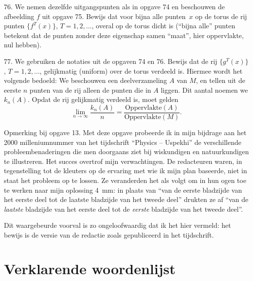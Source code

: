 \begin{problem}{76.}
	We nemen dezelfde uitgangspunten als in opgave 74 en beschou\-wen de afbeelding $f$ uit opgave 75. Bewijs dat voor bijna alle punten~$x$ op de torus de rij punten $\{f^T (x)\}$, $T=1,2,\dotsc$, overal op de torus dicht is (\enquote{bijna alle} punten betekent dat de punten zonder deze eigen\-schap samen \enquote{maat}, hier oppervlakte, nul hebben).
\end{problem}

\begin{problem}{77.}
	We gebruiken de notaties uit de opgaven 74 en 76. Bewijs dat de rij $\{g^T (x)\}$, $T=1,2,\dotsc$, gelijkmatig (uniform) over de torus verdeeld is. Hiermee wordt het volgende bedoeld: We beschouwen een deelverzameling $A$ van $M$, en tellen uit de eerste $n$ punten van de rij alleen de punten die in $A$ liggen. Dit aantal noemen we $k_n(A)$. Opdat de rij gelijkmatig verdeeld is, moet gelden
	\begin{equation*}
		\lim_{n \to \infty} \frac{k_n(A)}{n}=\frac{{\text{Oppervlakte}} (A)}{{\text{Oppervlakte}} (M)}.
	\end{equation*}
\end{problem}

\vfill

\begin{note}{Opmerking bij opgave 13.}
	Met deze opgave probeerde ik in mijn bijdrage aan het 2000 milleniumnummer van het tijdschrift \enquote{Physics -- Uspekhi} de verschillende probleembenaderingen die men doorgaans ziet bij wiskundigen en natuurkundigen te illustreren. Het succes over\-trof mijn verwachtingen. De redacteuren waren, in tegenstelling tot de kleuters op de ervaring met wie ik mijn plan baseerde, niet in staat het probleem op te lossen. Ze veranderden het als volgt om in hun ogen toe te werken naar mijn oplossing \SI{4}{\mm}: in plaats van \enquote{van de eerste bladzijde van het eerste deel tot de laatste bladzijde van het tweede deel} drukten ze af \enquote{van de \emph{laatste} bladzijde van het eerste deel tot de \emph{eerste} bladzijde van het tweede deel}.

	Dit waargebeurde voorval is zo ongeloofwaardig dat ik het hier vermeld: het bewijs is de versie van de redactie zoals gepubliceerd in het tijdschrift.
\end{note}

\clearpage

\section*{Verklarende woordenlijst}

